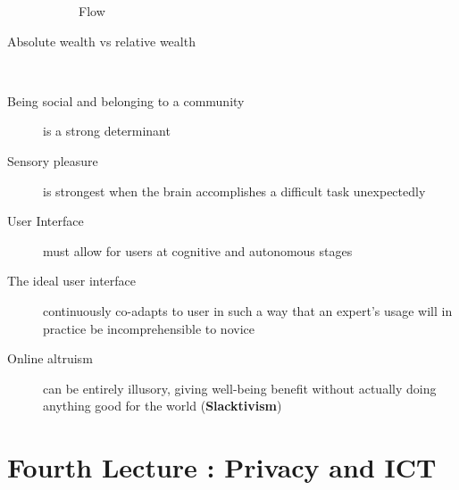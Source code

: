 \documentclass[a4paper]{article}
\begin{document}
\begin{description}
\begin{figure}[H]
\caption{Flow}
\end{figure}
\item[Absolute wealth vs relative wealth] ~
\item[Being social and belonging to a community] is a strong determinant
\item[Sensory pleasure] is strongest when the brain accomplishes a difficult task unexpectedly
\item[User Interface] must allow for users at cognitive and autonomous stages
\item[The ideal user interface] continuously co-adapts to user in such a way that an expert's usage will in practice be incomprehensible to novice
\item[Online altruism] can be entirely illusory, giving well-being benefit without actually doing anything good for the world (\textbf{Slacktivism})
\end{description}

\section{Fourth Lecture : Privacy and ICT}
\end{document}
